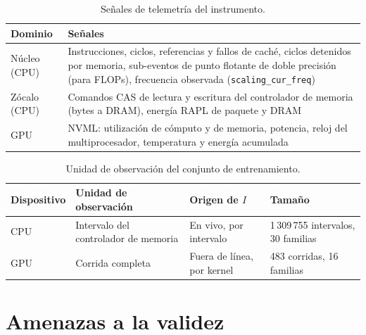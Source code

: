\begin{table}[H]
\centering
\caption{Señales de telemetría del instrumento.}
\label{tab:met-senales}
\small
\begin{tabular}{@{}>{\raggedright\arraybackslash}p{2.4cm}>{\raggedright\arraybackslash}p{11.4cm}@{}}
\toprule
\textbf{Dominio} & \textbf{Señales} \\
\midrule
Núcleo (CPU) & Instrucciones, ciclos, referencias y fallos de caché, ciclos detenidos por memoria, sub-eventos de punto flotante de doble precisión (para FLOPs), frecuencia observada (\texttt{scaling\_cur\_freq}) \\
Zócalo (CPU) & Comandos CAS de lectura y escritura del controlador de memoria (bytes a DRAM), energía RAPL de paquete y DRAM \\
GPU & NVML: utilización de cómputo y de memoria, potencia, reloj del multiprocesador, temperatura y energía acumulada \\
\bottomrule
\end{tabular}
\end{table}

\begin{table}[H]
\centering
\caption{Unidad de observación del conjunto de entrenamiento.}
\label{tab:met-granularidad}
\small
\setlength{\tabcolsep}{4pt}

\begin{tabularx}{\textwidth}{@{} l L L L @{}}
\toprule
\textbf{Dispositivo} & \textbf{Unidad de observación} & \textbf{Origen de \(I\)} & \textbf{Tamaño} \\
\midrule
CPU & Intervalo del controlador de memoria & En vivo, por intervalo & 1\,309\,755 intervalos, 30 familias \\
GPU & Corrida completa & Fuera de línea, por kernel & 483 corridas, 16 familias \\
\bottomrule
\end{tabularx}
\end{table}

\section{Amenazas a la validez}

